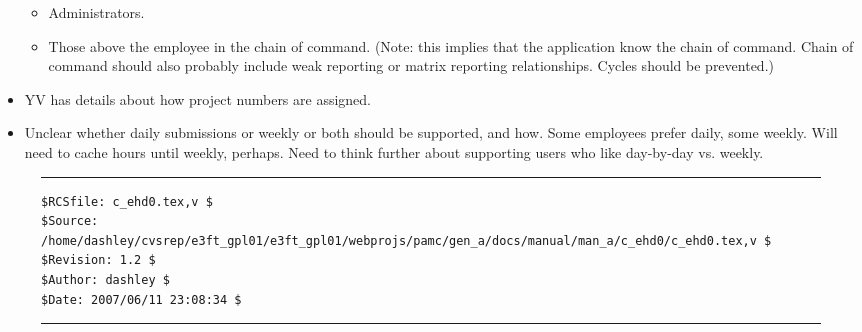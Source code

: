 \begin{itemize}
\begin{itemize}
      \item Administrators.
      \item Those above the employee in the chain of command.  (Note:  this implies that
            the application know the chain of command.  Chain of command should also
            probably include weak reporting or matrix reporting relationships.  Cycles
            should be prevented.)
      \end{itemize}
\item YV has details about how project numbers are assigned.
\item Unclear whether daily submissions or weekly or both should be supported, and how.
      Some employees prefer daily, some weekly.  Will need to cache hours until weekly,
      perhaps.  Need to think further about supporting users who like day-by-day vs.
      weekly.      
\end{itemize}


\noindent\begin{figure}[!b]
\noindent\rule[-0.25in]{\textwidth}{1pt}
\begin{tiny}
\begin{verbatim}
$RCSfile: c_ehd0.tex,v $
$Source: /home/dashley/cvsrep/e3ft_gpl01/e3ft_gpl01/webprojs/pamc/gen_a/docs/manual/man_a/c_ehd0/c_ehd0.tex,v $
$Revision: 1.2 $
$Author: dashley $
$Date: 2007/06/11 23:08:34 $
\end{verbatim}
\end{tiny}
\noindent\rule[0.25in]{\textwidth}{1pt}
\end{figure}

%
%
